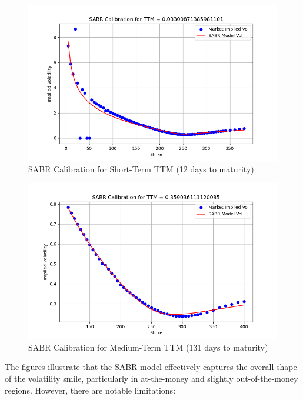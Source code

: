 \documentclass[11pt, oneside, a4paper, titlepage]{report}
\begin{document}
\begin{figure}[h!]
    \centering
    \includegraphics[width=1\textwidth]{Figure_1.png}
    \caption{SABR Calibration for Short-Term TTM (12 days to maturity)}
    \label{fig:sabr_calibration1}
\end{figure}

\begin{figure}[h!]
    \centering
    \includegraphics[width=1\textwidth]{sabr.png}
    \caption{SABR Calibration for Medium-Term TTM (131 days to maturity)}
    \label{fig:sabr_calibration2}
\end{figure}

The figures illustrate that the SABR model effectively captures the overall shape of the volatility smile, particularly in at-the-money and slightly out-of-the-money regions. However, there are notable limitations:
\end{document}
